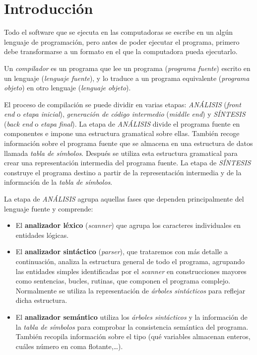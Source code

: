 
\section{Introducción}

Todo el software que se ejecuta en las computadoras se escribe en un algún lenguaje de programación,  pero antes de poder ejecutar el programa, primero debe transformarse a un formato en el que la computadora pueda ejecutarlo.  

Un \textit{compilador} es un programa que lee  un programa  (\textit{programa fuente}) escrito en un lenguaje (\textit{lenguaje fuente}), y lo traduce a un programa equivalente (\textit{programa objeto})  en otro lenguaje (\textit{lenguaje objeto}).

El proceso de compilación se puede dividir en varias etapas: \textit{ANÁLISIS} (\textit{front end} o \textit{etapa inicial}), \textit{generación de código intermedio} (\textit{middle end})  y \textit{SÍNTESIS} (\textit{back end} o \textit{etapa final}).  La etapa de \textit{ANÁLISIS} divide el programa fuente en componentes e impone una estructura gramatical sobre ellas. También recoge información sobre el programa fuente que se almacena en una estructura de datos llamada \textit{tabla de símbolos}. Después se utiliza esta estructura gramatical para crear una representación intermedia del programa fuente. La etapa de \textit{SÍNTESIS}  construye el programa destino a partir de la representación intermedia y de la información de la \textit{tabla de símbolos}\cite{jimenez2009compiladores}\cite{sintactico}.



La etapa de \textit{ANÁLISIS} agrupa aquellas fases que dependen principalmente del lenguaje fuente y comprende:

\begin{itemize}
	\item El \textbf{analizador léxico} (\textit{scanner}) que agrupa los caracteres individuales en entidades lógicas.
	\item El \textbf{analizador sintáctico} (\textit{parser}), que trataremos con más detalle a continuación, analiza la estructura general de todo el programa, agrupando las entidades simples identificadas por el \textit{scanner} en construcciones mayores como sentencias, bucles, rutinas, que componen el programa complejo. Normalmente se utiliza la representación de \textit{árboles sintácticos} para reflejar dicha estructura.
	\item El \textbf{analizador semántico} utiliza los \textit{árboles sintácticos} y la información de la \textit{tabla de símbolos} para comprobar la consistencia semántica del programa. También recopila información sobre el tipo (qué variables almacenan enteros, cuáles número en coma flotante,\dots{}).
	
\end{itemize}

